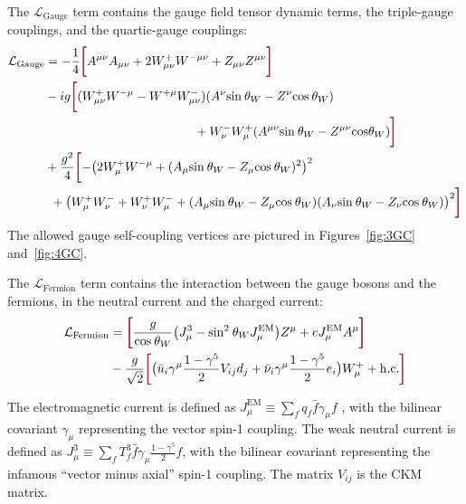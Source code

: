 The $\mathcal{L}_\mathrm{Gauge}$ term contains the gauge field tensor dynamic terms, the triple-gauge couplings, and the quartic-gauge couplings:
\begin{equation} 
\begin{split}
\label{eq:L_Gauge}
\mathcal{L}_\mathrm{Gauge} & = -\frac{1}{4} \termLB A^{\mu\nu} A_{\mu\nu} + 2  W^+_{\mu\nu} W^{{-}\mu\nu} + Z_{\mu\nu} Z^{\mu\nu} \termRB  \\ 
 & - ig \termLB (W^+_{\mu\nu} W^{{-}\mu} - W^{+\mu} W^{{-}}_{\mu\nu})(A^\nu\mathrm{sin}\:\theta_W - Z^\nu \mathrm{cos}\:\theta_W)  \\
 & \qquad\qquad\qquad\qquad\qquad\qquad + W^{{-}}_{\nu} W^+_{\mu} (A^{\mu\nu} \mathrm{sin}\:\theta_W - Z^{\mu\nu} \mathrm{cos} \theta_W ) \termRB  \\
 & + \frac{g^2}{4} \termLB {-}\big( 2 W^+_\mu W^{{-}\mu} + (A_\mu \mathrm{sin}\:\theta_W - Z_\mu \mathrm{cos}\:\theta_W)^2 \big)^2 \\
 & \:\: + \big( W_\mu^+ W_\nu^{{-}} + W_\nu^+ W_\mu^{{-}} + (A_\mu \mathrm{sin}\:\theta_W - Z_\mu \mathrm{cos}\:\theta_W)(A_\nu\mathrm{sin}\:\theta_W - Z_\nu \mathrm{cos}\:\theta_W)\big)^2 \termRB
\end{split}
\end{equation}
The allowed gauge self-coupling vertices are pictured in Figures~\ref{fig:3GC} and~\ref{fig:4GC}.

The $\mathcal{L}_\mathrm{Fermion}$ term contains the interaction between the gauge bosons and the fermions, in the neutral current and the charged current:
\begin{equation}
\begin{split}
\label{eq:L_Fermion}
\mathcal{L}_\mathrm{Fermion} & = \termLB \frac{g}{\mathrm{cos}\:\theta_W} \big(J_\mu^\mathrm{3} - \mathrm{sin}^2\:\theta_W J_\mu^\mathrm{EM} \big) Z^\mu + eJ_\mu^\mathrm{EM} A^\mu \termRB \\
& - \frac{g}{\sqrt{2}} \termLB \big( \bar{u}_i \gamma^\mu \frac{1-\gamma^5}{2} V_{ij} d_j + \bar{\nu}_i \gamma^\mu \frac{1-\gamma^5}{2} e_i \big) W_\mu^+ + \mathrm{h.c.} \termRB
\end{split}
\end{equation}

The electromagnetic current is defined as $J^\mathrm{EM}_\mu \equiv \sum_f q_f \bar{f} \gamma_\mu f$ , with the bilinear covariant $\gamma_\mu$ representing the vector spin-1 coupling.
The weak neutral current is defined as $J^\mathrm{3}_\mu \equiv \sum_f T^3_f \bar{f} \gamma_\mu \frac{1-\gamma^5}{2} f$,
with the bilinear covariant representing the infamous ``vector minus axial'' spin-1 coupling.
The matrix $V_{ij}$ is the CKM matrix.

